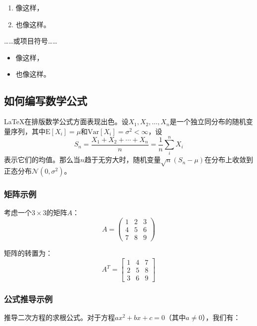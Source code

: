 \documentclass{article}
\begin{document}
\begin{enumerate}
    \item 像这样，
    \item 也像这样。
\end{enumerate}
……或项目符号……
\begin{itemize}
    \item 像这样，
    \item 也像这样。
\end{itemize}

\subsection{如何编写数学公式}

\LaTeX{}在排版数学公式方面表现出色。设$X_1, X_2, \ldots, X_n$是一个独立同分布的随机变量序列，其中$\text{E}[X_i] = \mu$和$\text{Var}[X_i] = \sigma^2 < \infty$，设
\[S_n = \frac{X_1 + X_2 + \cdots + X_n}{n}
    = \frac{1}{n}\sum_{i}^{n} X_i\]
表示它们的均值。那么当$n$趋于无穷大时，随机变量$\sqrt{n}(S_n - \mu)$在分布上收敛到正态分布$\mathcal{N}(0, \sigma^2)$。

\subsubsection{矩阵示例}

考虑一个$3 \times 3$的矩阵$A$：
\[A = \begin{pmatrix}
        1 & 2 & 3 \\
        4 & 5 & 6 \\
        7 & 8 & 9
    \end{pmatrix}\]

矩阵的转置为：
\[A^T = \begin{bmatrix}
        1 & 4 & 7 \\
        2 & 5 & 8 \\
        3 & 6 & 9
    \end{bmatrix}\]

\subsubsection{公式推导示例}

推导二次方程的求根公式。对于方程$ax^2 + bx + c = 0$（其中$a \neq 0$），我们有：
\end{document}
